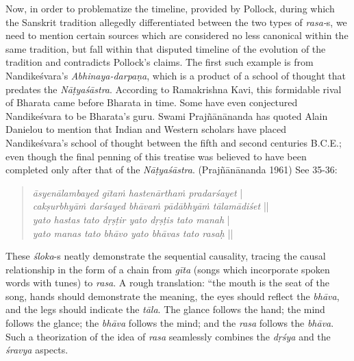 Now, in order to problematize the timeline, provided by Pollock, during which the Sanskrit tradition allegedly differentiated between the two types of \textsl{rasa-}s, we need to mention certain sources which are considered no less canonical within the same tradition, but fall within that disputed timeline of the evolution of the tradition and contradicts Pollock’s claims. The first such example is from Nandikeśvara’s \textsl{Abhinaya-darpaṇa}, which is a product of a school of thought that predates the \textsl{Nāṭyaśāstra}. According to Ramakrishna Kavi, this formidable rival of Bharata came before Bharata in time. Some have even conjectured Nandikeśvara to be Bharata’s guru. Swami Prajñānānanda has quoted Alain Danielou to mention that Indian and Western scholars have placed Nandikeśvara’s school of thought between the fifth and second centuries B.C.E.; even though the final penning of this treatise was believed to have been completed only after that of the \textsl{Nāṭyaśāstra}. (Prajñānānanda 1961) See 35-36:
\begin{quote}
\textsl{āsyenālambayed gītaṁ hastenārthaṁ pradarśayet} |  \\
\textsl{cakṣurbhyāṁ darśayed bhāvaṁ pādābhyāṁ tālamādiśet} ||   \\
\textsl{yato hastas tato dṛṣṭir yato dṛṣṭis tato manah} | \\
\textsl{yato manas tato bhāvo yato bhāvas tato rasaḥ} || 
\end{quote}

These \textsl{śloka}-s neatly demonstrate the sequential causality, tracing the causal relationship in the form of a chain from \textsl{gīta} (songs which incorporate spoken words with tunes) to \textsl{rasa}. A rough translation: “the mouth is the seat of the song, hands should demonstrate the meaning, the eyes should reflect the \textsl{bhāva}, and the legs should indicate the \textsl{tāla}. The glance follows the hand; the mind follows the glance; the \textsl{bhāva} follows the mind; and the \textsl{rasa} follows the \textsl{bhāva}. Such a theorization of the idea of \textsl{rasa} seamlessly combines the \textsl{dṛśya} and the \textsl{śravya} aspects. 

